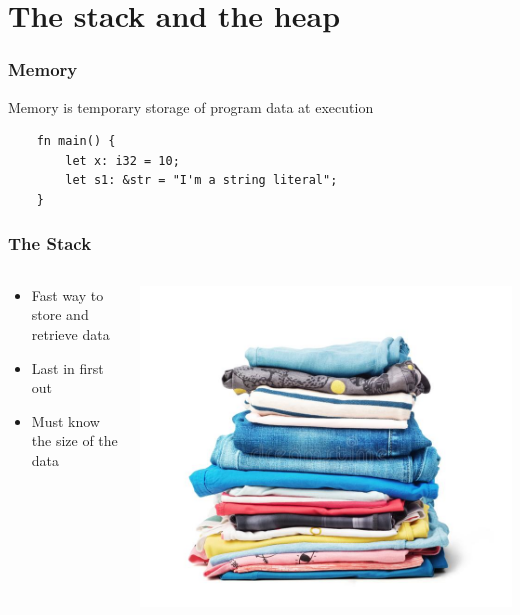 \documentclass{beamer}
\begin{document}
\section{The stack and the heap}
\begin{frame}[fragile]
    \frametitle{Memory}
    Memory is temporary storage of program data at execution
    \begin{verbatim}
    fn main() {
        let x: i32 = 10;
        let s1: &str = "I'm a string literal";
    }
    \end{verbatim}
\end{frame}
\begin{frame}
    \frametitle{The Stack}
    \begin{columns}
        \begin{column}{0.5\textwidth}
            \begin{itemize}
                \item Fast way to store and retrieve data
                \item Last in first out
                \item Must know the size of the data
            \end{itemize}
        \end{column}
        \begin{column}{0.5\textwidth}
            \includegraphics[width=\textwidth]{images/stack.png}
            \vfill
        \end{column}
    \end{columns}
\end{frame}
\end{document}
